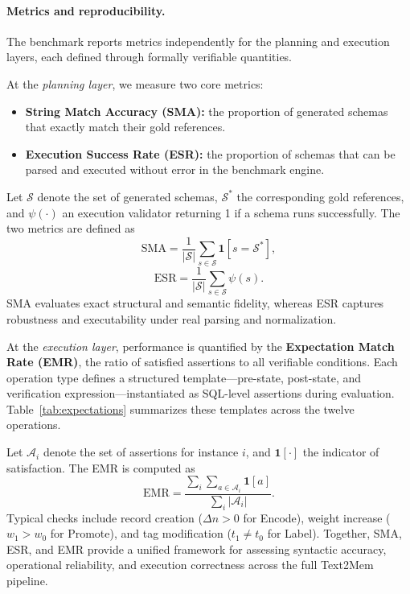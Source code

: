 \documentclass[conference]{IEEEtran}
\begin{document}


\paragraph{Metrics and reproducibility.}
The benchmark reports metrics independently for the planning and execution layers, each defined through formally verifiable quantities.

At the \emph{planning layer}, we measure two core metrics:  
\begin{itemize}
    \item \textbf{String Match Accuracy (SMA):} the proportion of generated schemas that exactly match their gold references.  
    \item \textbf{Execution Success Rate (ESR):} the proportion of schemas that can be parsed and executed without error in the benchmark engine.  
\end{itemize}

Let $\mathcal{S}$ denote the set of generated schemas, $\mathcal{S}^*$ the corresponding gold references,  
and $\psi(\cdot)$ an execution validator returning 1 if a schema runs successfully.  
The two metrics are defined as
\[
\mathrm{SMA} =
\frac{1}{|\mathcal{S}|}
\sum_{s \in \mathcal{S}} 
\mathbf{1}[s = \mathcal{S}^*],
\]
\[
\mathrm{ESR} =
\frac{1}{|\mathcal{S}|}
\sum_{s \in \mathcal{S}}
\psi(s).
\]
SMA evaluates exact structural and semantic fidelity, whereas ESR captures robustness and executability under real parsing and normalization.

At the \emph{execution layer}, performance is quantified by the \textbf{Expectation Match Rate (EMR)}, 
the ratio of satisfied assertions to all verifiable conditions.  
Each operation type defines a structured template—pre-state, post-state, and verification expression—instantiated as SQL-level assertions during evaluation.  
Table~\ref{tab:expectations} summarizes these templates across the twelve operations.

Let $\mathcal{A}_i$ denote the set of assertions for instance $i$, and $\mathbf{1}[\cdot]$ the indicator of satisfaction.  
The EMR is computed as
\[
\mathrm{EMR} =
\frac{\sum_i \sum_{a \in \mathcal{A}_i} \mathbf{1}[a]}
{\sum_i |\mathcal{A}_i|}.
\]
Typical checks include record creation ($\Delta n{>}0$ for Encode), weight increase ($w_1{>}w_0$ for Promote), and tag modification ($t_1{\neq}t_0$ for Label).  
Together, SMA, ESR, and EMR provide a unified framework for assessing syntactic accuracy, operational reliability, and execution correctness across the full Text2Mem pipeline.
\end{document}
